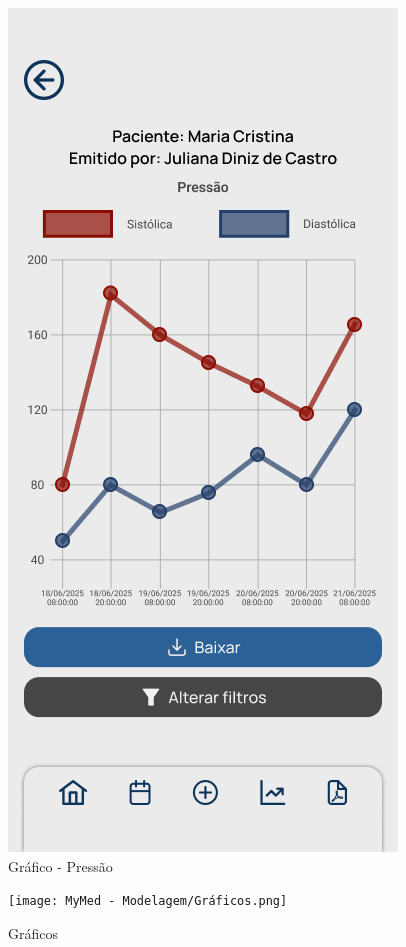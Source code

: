 \begin{figure}[!htbp]
	\centering
	\includegraphics[width=0.6\linewidth]{MyMed - Modelagem/Gráfico - Pressão.png}
	\caption{Gráfico - Pressão}
	\label{grafico_pressao}
\end{figure}

\begin{figure}[!htbp]
	\centering
	\texttt{[image: MyMed - Modelagem/Gráficos.png]}
	\caption{Gráficos}
	\label{graficos}
\end{figure}

